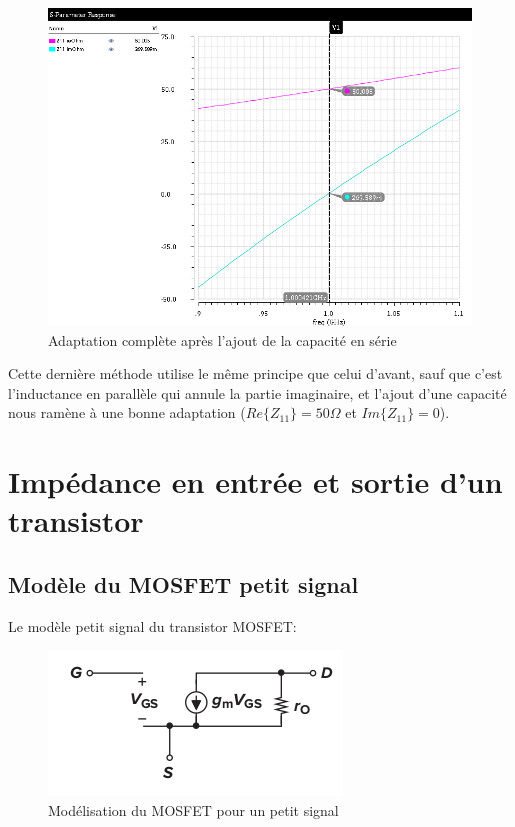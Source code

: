 \documentclass[a4paper]{article}
\begin{document}
\begin{figure}[!htb]
\begin{center}
  \includegraphics[scale=0.52]{Z11-2nd-adaptation.png}
  \caption{Adaptation compl\`ete apr\`es l'ajout de la capacit\'e en s\'erie}
\end{center}
\end{figure}

Cette derni\`ere m\'ethode utilise le m\^eme principe que celui d'avant, sauf que c'est l'inductance
en parall\`ele qui annule la partie imaginaire, et l'ajout d'une capacit\'e nous ram\`ene \`a une bonne
adaptation ($Re\{Z_{11}\} = 50 \Omega$ et $Im\{Z_{11}\} = 0$).

\clearpage

\section{Imp\'edance en entr\'ee et sortie d'un transistor}
\subsection{Mod\`ele du MOSFET petit signal}
Le mod\`ele petit signal du transistor MOSFET:

\begin{figure}[!htb]
\begin{center}
  \includegraphics[scale=0.7]{MOS_small_signal.png}
  \caption{Mod\'elisation du MOSFET pour un petit signal\cite{Analog-CMOS-microelectronics} }
\end{center}
\end{figure}
\end{document}
